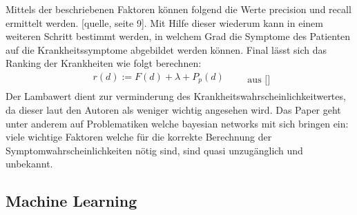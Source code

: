\noindent
Mittels der beschriebenen Faktoren können folgend die Werte precision und recall ermittelt werden. [quelle, seite 9]. Mit Hilfe dieser wiederum kann in einem weiteren Schritt bestimmt werden, in welchem Grad die Symptome des Patienten auf die Krankheitssymptome abgebildet werden können. Final lässt sich das Ranking der Krankheiten wie folgt berechnen:
\begin{equation}
	  \begin{aligned}
		r(d) := F(d) + \lambda + P_p(d)\\
	 \end{aligned}\qquad\text{aus []}
\end{equation}
Der Lambawert dient zur verminderung des Krankheitswahrscheinlichkeitwertes, da dieser laut den Autoren als weniger wichtig angesehen wird. 
\newline
\noindent
Das Paper geht unter anderem auf Problematiken welche bayesian networks mit sich bringen ein: viele wichtige Faktoren welche für die korrekte Berechnung der Symptomwahrscheinlichkeiten nötig sind, sind quasi unzugänglich und unbekannt. 

\subsection{Machine Learning}
